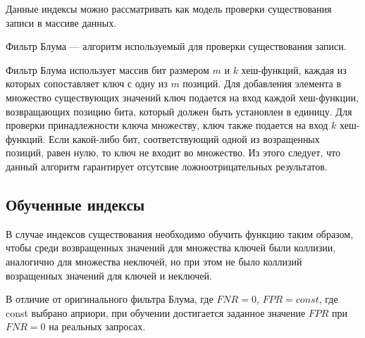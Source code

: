 Данные индексы можно рассматривать как модель проверки существования записи в
массиве данных.

Фильтр Блума --- алгоритм используемый для проверки существования записи.

Фильтр Блума использует массив бит размером $m$ и $k$ хеш-функций, каждая из
которых сопоставляет ключ с одну из $m$ позиций. Для добавления элемента в
множество существующих значений ключ подается на вход каждой хеш-функции,
возвращающих позицию бита, который должен быть установлен в единицу. Для
проверки принадлежности ключа множеству, ключ также подается на вход $k$
хеш-функций.  Если какой-либо бит, соответствующий одной из возращенных позиций,
равен нулю, то ключ не входит во множество. Из этого следует, что данный
алгоритм гарантирует отсутсвие ложноотрицательных результатов.



\subsection{Обученные индексы}

В случае индексов существования необходимо обучить функцию таким образом, чтобы
среди возвращенных значений для множества ключей были коллизии, аналогично для
множества неключей, но при этом не было коллизий возращенных значений для ключей
и неключей. 


В отличие от оригинального фильтра Блума, где $FNR = 0$, $FPR = const$, где
const выбрано априори, при обучении достигается заданное значение $FPR$ при $FNR
= 0$ на реальных запросах.
